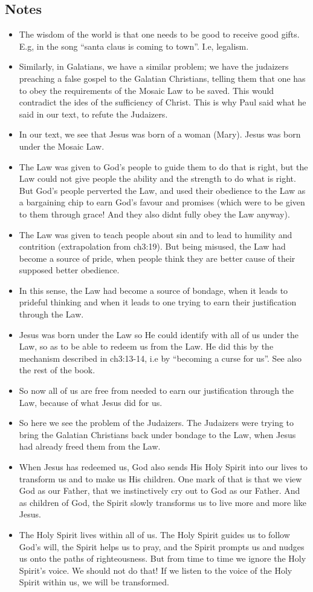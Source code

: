 \subsection*{Notes}
\begin{itemize}
  \item{The wisdom of the world is that one needs to be good to receive good gifts. E.g, in the song “santa claus is coming to town”. I.e, legalism.}
  \item{Similarly, in Galatians, we have a similar problem; we have the judaizers preaching a false gospel to the Galatian Christians, telling them that one has to obey the requirements of the Mosaic Law to be saved. This would contradict the ides of the sufficiency of Christ. This is why Paul said what he said in our text, to refute the Judaizers.}
  \item{In our text, we see that Jesus was born of a woman (Mary). Jesus was born under the Mosaic Law.}
  \item{The Law was given to God’s people to guide them to do that is right, but the Law could not give people the ability and the strength to do what is right. But God’s people perverted the Law, and used their obedience to the Law as a bargaining chip to earn God’s favour and promises (which were to be given to them through grace! And they also didnt fully obey the Law anyway).}
  \item{The Law was given to teach people about sin and to lead to humility and contrition (extrapolation from ch3:19). But being misused, the Law had become a source of pride, when people think they are better cause of their supposed better obedience.}
  \item{In this sense, the Law had become a source of bondage, when it leads to prideful thinking and when it leads to one trying to earn their justification through the Law.}
  \item{Jesus was born under the Law so He could identify with all of us under the Law, so as to be able to redeem us from the Law. He did this by the mechanism described in ch3:13-14, i.e by “becoming a curse for us”. See also the rest of the book. }
  \item{So now all of us are free from needed to earn our justification through the Law, because of what Jesus did for us.}
  \item{So here we see the problem of the Judaizers. The Judaizers were trying to bring the Galatian Christians back under bondage to the Law, when Jesus had already freed them from the Law.}
  \item{When Jesus has redeemed us, God also sends His Holy Spirit into our lives to transform us and to make us His children. One mark of that is that we view God as our Father, that we instinctively cry out to God as our Father. And as children of God, the Spirit slowly transforms us to live more and more like Jesus. }
  \item{The Holy Spirit lives within all of us. The Holy Spirit guides us to follow God’s will, the Spirit helps us to pray, and the Spirit prompts us and nudges us onto the paths of righteousness. But from time to time we ignore the Holy Spirit’s voice. We should not do that! If we listen to the voice of the Holy Spirit within us, we will be transformed.}
\end{itemize}